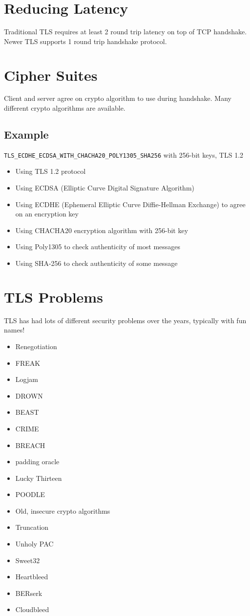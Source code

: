 \documentclass[../CMPUT-404-Notes.tex]{subfiles}
\begin{document}
\section{Reducing Latency}
Traditional TLS requires at least 2 round trip latency on top of TCP handshake. Newer TLS supports 1 round trip handshake protocol.

\section{Cipher Suites}
Client and server agree on crypto algorithm to use during handshake.
Many different crypto algorithms are available.

\subsection{Example}
\texttt{TLS_ECDHE_ECDSA_WITH_CHACHA20_POLY1305_SHA256} with 256-bit keys, TLS 1.2
\begin{itemize}
  \item Using TLS 1.2 protocol
  \item Using ECDSA (Elliptic Curve Digital Signature Algorithm)
  \item Using ECDHE (Ephemeral Elliptic Curve Diffie-Hellman Exchange) to agree on an encryption key
  \item Using CHACHA20 encryption algorithm with 256-bit key
  \item Using Poly1305 to check authenticity of most messages
  \item Using SHA-256 to check authenticity of some message
\end{itemize}

\section{TLS Problems}
TLS has had lots of different security problems over the years, typically with fun names!
\begin{itemize}
  \item Renegotiation
  \item FREAK
  \item Logjam
  \item DROWN
  \item BEAST
  \item CRIME
  \item BREACH
  \item padding oracle
  \item Lucky Thirteen
  \item POODLE
  \item Old, insecure crypto algorithms
  \item Truncation
  \item Unholy PAC
  \item Sweet32
  \item Heartbleed
  \item BERserk
  \item Cloudbleed 
\end{itemize}
\end{document}
